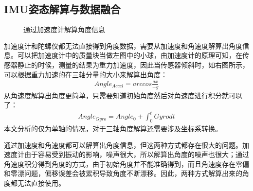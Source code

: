 \subsection{IMU姿态解算与数据融合}

\begin{figure}[htb]
    \quad
    \caption{通过加速度计解算角度信息}
    \label{fig:subfigss}
\end{figure}

加速度计和陀螺仪都无法直接得到角度数据，需要从加速度和角速度解算出角度信息。可以把加速度计中的质量块当做左图中的小球，由加速度计的原理可知，在传感器静止的时候，测量的结果为重力加速度，因此当传感器倾斜时，如右图所示，可以根据重力加速的在三轴分量的大小来解算出角度：
\begin{align}
Angle_{Accel} = arccos\frac{ax}{-g}
\end{align}
从角速度解算出角度更简单，只需要知道初始角度然后对角速度进行积分就可以了：
\begin{align}
Angle_{Gyro}=Angle_0 + \int_0^t Gyro dt
\end{align}
本文分析的仅为单轴的情况，对于三轴角度解算还需要涉及坐标系转换。

通过加速度和角速度都可以解算出角度信息，但这两种方式都存在很大的问题。加速度计由于容易受到振动的影响，噪声很大，所以解算出角度的噪声也很大；通过角速度积分得到角度的方式，由于初始角度并不能准确得到，而且角速度存在零偏和零漂问题，偏移误差会被累积导致角度不断漂移。因此，两种方式解算出来的角度都无法直接使用。

